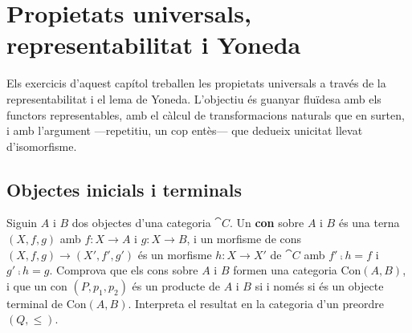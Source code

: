 \chapter[Representabilitat i Yoneda]{\texorpdfstring{Propietats universals,\\ representabilitat i Yoneda}{Propietats universals, representabilitat i Yoneda}}

Els exercicis d'aquest capítol treballen les propietats universals a través de la representabilitat i el lema de Yoneda. L'objectiu és guanyar fluïdesa amb els functors representables, amb el càlcul de transformacions naturals que en surten, i amb l'argument ---repetitiu, un cop entès--- que dedueix unicitat llevat d'isomorfisme.

\section{Objectes inicials i terminals}

\begin{exercici}\label{pr-producte-terminal}
Siguin $A$ i $B$ dos objectes d'una categoria $\cat{C}$. Un \textbf{con} sobre $A$ i $B$ és una terna $(X,f,g)$ amb $f\colon X\to A$ i $g\colon X\to B$, i un morfisme de cons $(X,f,g)\to(X',f',g')$ és un morfisme $h\colon X\to X'$ de $\cat{C}$ amb $f'\comp h=f$ i $g'\comp h=g$. Comprova que els cons sobre $A$ i $B$ formen una categoria $\mathrm{Con}(A,B)$, i que un con $(P,p_1,p_2)$ és un producte de $A$ i $B$ si i només si és un objecte terminal de $\mathrm{Con}(A,B)$. Interpreta el resultat en la categoria d'un preordre $(Q,\le)$.
\end{exercici}

